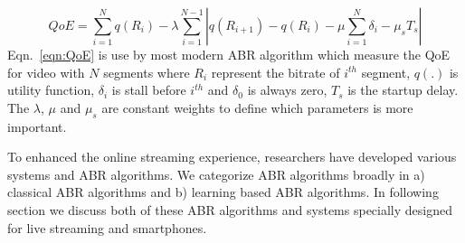 \begin{equation}
\label{eqn:QoE}
QoE = \sum_{i=1}^N q(R_i) - \lambda\sum_{i=1}^{N-1}\left|q(R_{i+1})-q(R_i) - \mu\sum_{i=1}^N \delta_i - \mu_s T_s\right|
\end{equation}
Eqn.~\ref{eqn:QoE} is use by most modern ABR algorithm which measure the QoE for video with $N$ segments where $R_i$ represent the bitrate of $i^{th}$ segment, $q(.)$ is utility function, $\delta_i$ is stall before $i^{th}$ and $\delta_0$ is always zero, $T_s$ is the startup delay. The $\lambda$, $\mu$ and $\mu_s$ are constant weights to define which parameters is more important.

To enhanced the online streaming experience, researchers have developed various systems and ABR algorithms. We categorize ABR algorithms broadly in a) classical ABR algorithms and b) learning based ABR algorithms. In following section we discuss both of these ABR algorithms and systems specially designed for live streaming and smartphones.

